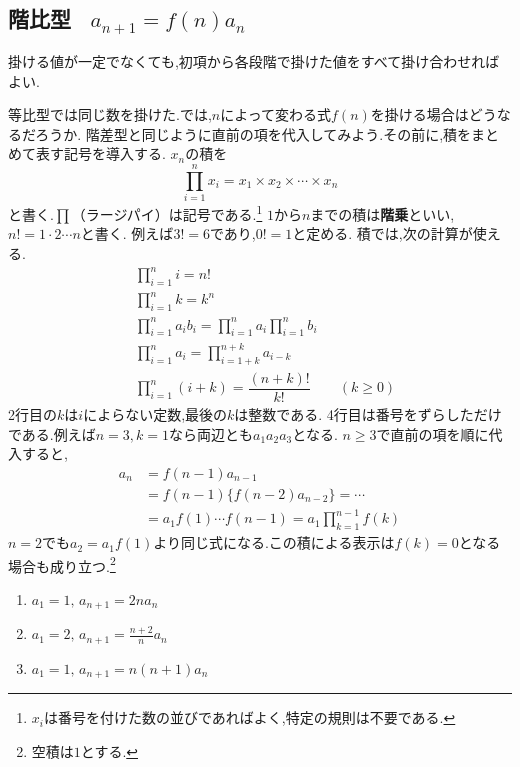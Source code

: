 
  \subsection{\texorpdfstring{階比型 \, $a_{n+1}=f(n)a_n$}{階比型}}\label{節：階比型}
  \begin{bookpoint}
    掛ける値が一定でなくても,初項から各段階で掛けた値をすべて掛け合わせればよい.
  \end{bookpoint}
    等比型では同じ数を掛けた.では,$n$によって変わる式$f(n)$を掛ける場合はどうなるだろうか.
    階差型と同じように直前の項を代入してみよう.その前に,積をまとめて表す記号を導入する.
    $x_n$の積を
    \[
      \prod_{i=1}^n x_i
      =x_1\times x_2\times\cdots\times x_n
    \]
    と書く.$\prod$（ラージパイ）は記号である.\footnote{$x_i$は番号を付けた数の並びであればよく,特定の規則は不要である.}
    $1$から$n$までの積は\textbf{階乗}といい,$n!=1\cdot2\cdots n$と書く.
    例えば$3!=6$であり,$0!=1$と定める.
    積では,次の計算が使える.
    \begin{align*}
      &\prod_{i=1}^{n}i=n!\\
      &\prod_{i=1}^{n}k=k^n\\
      &\prod_{i=1}^{n}a_ib_i=\displaystyle\prod_{i=1}^na_i\displaystyle\prod_{i=1}^nb_i\\
      &\prod_{i=1}^{n}a_i=\displaystyle\prod_{i=1+k}^{n+k}a_{i-k}\\
      &\prod_{i=1}^{n}(i+k)=\dfrac{(n+k)!}{k!}\qquad(k\ge0)
    \end{align*}
    2行目の$k$は$i$によらない定数,最後の$k$は整数である.
    4行目は番号をずらしただけである.例えば$n=3,k=1$なら両辺とも$a_1a_2a_3$となる.
    $n\ge3$で直前の項を順に代入すると,
    \begin{align*}
      a_n&=f(n-1)a_{n-1}\\
         &=f(n-1)\{f(n-2)a_{n-2}\}=\cdots\\
         &=a_1f(1)\cdots f(n-1)=a_1\prod_{k=1}^{n-1}f(k)
    \end{align*}
    $n=2$でも$a_2=a_1f(1)$より同じ式になる.この積による表示は$f(k)=0$となる場合も成り立つ.\footnote{空積は$1$とする.}
    \noindent {}\par\nobreak
    \begin{enumerate}[label=(\arabic*),parsep=3pt,format=\bookitemlink{example-ratio-1}{problem}{answer}]
      \item $\displaystyle a_1=1,\, a_{n+1}=2na_n$
      \item $\displaystyle a_1=2,\, a_{n+1}=\frac{n+2}{n}a_n$
      \item $\displaystyle a_1=1,\, a_{n+1}=n(n+1)a_n$
    \end{enumerate}

